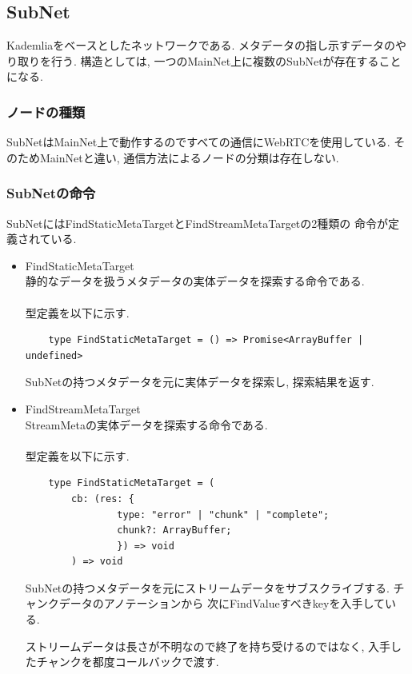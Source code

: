 \documentclass[sotsuron]{jcsie}
\begin{document}
\subsection{SubNet}
Kademliaをベースとしたネットワークである.
メタデータの指し示すデータのやり取りを行う.
構造としては, 一つのMainNet上に複数のSubNetが存在することになる.

\subsubsection{ノードの種類}
SubNetはMainNet上で動作するのですべての通信にWebRTCを使用している.
そのためMainNetと違い, 通信方法によるノードの分類は存在しない.

\subsubsection{SubNetの命令}
SubNetにはFindStaticMetaTargetとFindStreamMetaTargetの2種類の
命令が定義されている.
\begin{itemize}
	\item {FindStaticMetaTarget}\\
	      静的なデータを扱うメタデータの実体データを探索する命令である.
	      \\\\
	      型定義を以下に示す.
	      \begin{lstlisting}
	type FindStaticMetaTarget = () => Promise<ArrayBuffer | undefined>
	      \end{lstlisting}
	      SubNetの持つメタデータを元に実体データを探索し, 
	      探索結果を返す.
	      \\
	\item {FindStreamMetaTarget}\\
	      StreamMetaの実体データを探索する命令である.
	      \\\\
	      型定義を以下に示す.
	      \begin{lstlisting}
	type FindStaticMetaTarget = (
		cb: (res: {
				type: "error" | "chunk" | "complete";
				chunk?: ArrayBuffer;
				}) => void
		) => void
	      \end{lstlisting}
	      SubNetの持つメタデータを元にストリームデータをサブスクライブする.
	      チャンクデータのアノテーションから
	      次にFindValueすべきkeyを入手している.
	      	      	
	      ストリームデータは長さが不明なので終了を持ち受けるのではなく, 
	      入手したチャンクを都度コールバックで渡す.
\end{itemize}
\end{document}

